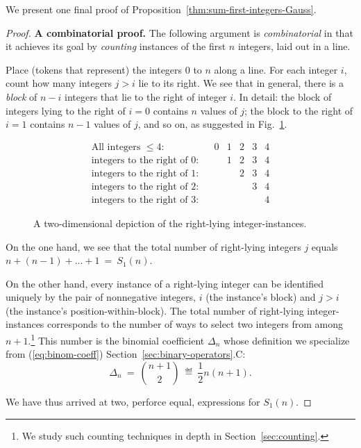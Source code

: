 \medskip

We present one final proof of
Proposition~\ref{thm:sum-first-integers-Gauss}.

\begin{proof}
{\bf A combinatorial proof.}
%
The following argument is {\it combinatorial} in that it achieves its
goal by {\em counting} instances of the first $n$ integers, laid out
in a line.

Place (tokens that represent) the integers $0$ to $n$ along a line.
For each integer $i$, count how many integers $j > i$ lie to its
right.  We see that in general, there is a {\it block} of $n-i$
integers that lie to the right of integer $i$.  In detail: the block
of integers lying to the right of $i=0$ contains $n$ values of $j$;
the block to the right of $i=1$ contains $n-1$ values of $j$, and so
on, as suggested in Fig.~\ref{fig:rightward-instances}.

\begin{figure}[htb]
\[
\begin{array}{lcccccc}
\mbox{All integers $\leq 4$:} &
 & 0 & 1 & 2 & 3 & 4 \\
\mbox{integers to the right of $0$:} &
 &   & 1 & 2 & 3 & 4 \\
\mbox{integers to the right of $1$:} &
 &   &   & 2 & 3 & 4 \\
\mbox{integers to the right of $2$:} &
 &   &   &   & 3 & 4 \\
\mbox{integers to the right of $3$:} &
 &   &   &   &   & 4
\end{array}
\]
\caption{A two-dimensional depiction of the right-lying
  integer-instances.}
\label{fig:rightward-instances}
\end{figure}

On the one hand, we see that the total number of right-lying integers
$j$ equals $n+(n-1)+ ... + 1 \ = \ S_1(n)$.

On the other hand, every instance of a right-lying integer can be
identified uniquely by the pair of nonnegative integers, $i$ (the
instance's block) and $j>i$ (the instance's position-within-block).
The total number of right-lying integer-instances corresponds to the
number of ways to select two integers from among $n+1$.\footnote{We
  study such counting techniques in depth in
  Section~\ref{sec:counting}.}  This number is the binomial
coefficient $\Delta_{n}$ whose definition we specialize from
(\ref{eq:binom-coeff}) Section~\ref{sec:binary-operators}.C:
\[ 
\Delta_n \ = \ {{n+1} \choose 2} \ \eqdef \ \frac{1}{2} n(n+1).
\]

We have thus arrived at two, perforce equal, expressions for $S_1(n)$.
\end{proof}

